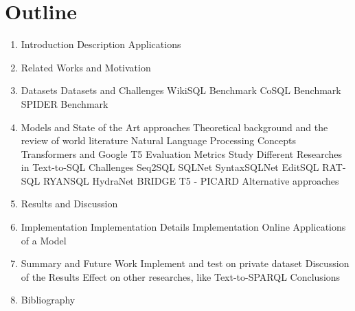 \newpage
\section{Outline}
\begin{enumerate}

      \item Introduction
            \subitem Description
            \subitem Applications
      \item Related Works and Motivation
      \item Datasets
            \subitem Datasets and Challenges
            \subitem WikiSQL Benchmark
            \subitem CoSQL Benchmark
            \subitem SPIDER Benchmark
      \item Models and State of the Art approaches
            \subitem Theoretical background and the review of world literature
            \subitem Natural Language Processing Concepts
            \subitem Transformers and Google T5 \cite{2020t5}
            \subitem Evaluation Metrics \cite{vig_comparison_2019}
            \subitem Study Different Researches in Text-to-SQL Challenges
            \subsubitem Seq2SQL \cite{zhong_seq2sql_2017}
            \subsubitem SQLNet \cite{xu_sqlnet_2017}
            \subsubitem SyntaxSQLNet \cite{DBLP:journals/corr/abs-1810-05237}
            \subsubitem EditSQL \cite{zhang2019editing}
            \subsubitem RAT-SQL \cite{wang_rat-sql_2021}
            \subsubitem RYANSQL \cite{choi_ryansql_2020}
            \subsubitem HydraNet \cite{lyu_hybrid_2020}
            \subsubitem BRIDGE \cite{lin_bridging_2020}
            \subsubitem T5 - PICARD \cite{scholak_picard_2021}
            \subsubitem Alternative approaches
      \item Results and Discussion
      \item Implementation
            \subitem Implementation Details
            \subitem Implementation Online Applications of a Model
      \item Summary and Future Work
            \subitem Implement and test on private dataset
            \subitem Discussion of the Results
            \subitem Effect on other researches, like Text-to-SPARQL
            \subitem Conclusions
      \item Bibliography

\end{enumerate}
